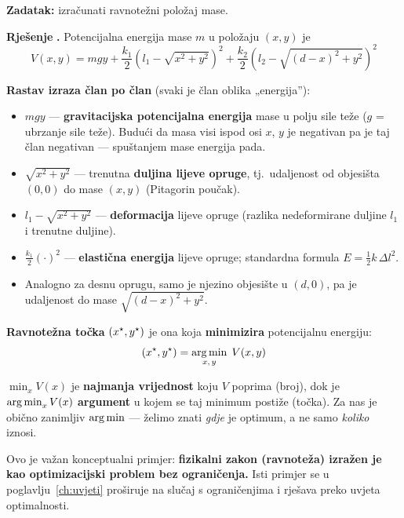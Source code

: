 \textbf{Zadatak:} izračunati ravnotežni položaj mase.

\textbf{Rješenje} \textbf{.} Potencijalna energija mase $m$ u položaju
$(x,y)$ je
\begin{equation}
V(x,y) = mgy
+ \frac{k_1}{2}\left(l_1 - \sqrt{x^2 + y^2}\right)^2
+ \frac{k_2}{2}\left(l_2 - \sqrt{(d-x)^2 + y^2}\right)^2
\end{equation}

\textbf{Rastav izraza član po član} (svaki je član oblika „energija”):

\begin{itemize}
  \item $mgy$ --- \textbf{gravitacijska potencijalna energija} mase u polju sile
        teže ($g$ = ubrzanje sile teže). Budući da masa visi ispod osi $x$, $y$
        je negativan pa je taj član negativan --- spuštanjem mase energija pada.
  \item $\sqrt{x^2 + y^2}$ --- trenutna \textbf{duljina lijeve opruge}, tj.\
        udaljenost od objesišta $(0,0)$ do mase $(x,y)$ (Pitagorin poučak).
  \item $l_1 - \sqrt{x^2+y^2}$ --- \textbf{deformacija} lijeve opruge (razlika
        nedeformirane duljine $l_1$ i trenutne duljine).
  \item $\frac{k_1}{2}(\cdot)^2$ --- \textbf{elastična energija} lijeve opruge;
        standardna formula $E = \tfrac{1}{2}k\,\Delta l^2$.
  \item Analogno za desnu oprugu, samo je njezino objesište u $(d, 0)$, pa je
        udaljenost do mase $\sqrt{(d-x)^2 + y^2}$.
\end{itemize}

\textbf{Ravnotežna točka} $(x^{\star}, y^{\star})$ je ona koja \textbf{minimizira}
potencijalnu energiju:
\begin{equation}
(x^{\star}, y^{\star}) = \operatorname*{arg\,min}_{x,\,y} \; V(x,y)
\end{equation}

\begin{napomena}
$\min_x V(x)$ je \textbf{najmanja vrijednost} koju $V$ poprima (broj), dok je
$\operatorname*{arg\,min}_x V(x)$ \textbf{argument} u kojem se taj minimum postiže (točka). Za
nas je obično zanimljiv $\operatorname*{arg\,min}$ --- želimo znati \emph{gdje} je optimum, a ne
samo \emph{koliko} iznosi.
\end{napomena}

Ovo je važan konceptualni primjer: \textbf{fizikalni zakon (ravnoteža) izražen
je kao optimizacijski problem bez ograničenja.} Isti primjer se u
poglavlju~\ref{ch:uvjeti} proširuje na slučaj s ograničenjima i rješava preko
uvjeta optimalnosti.

